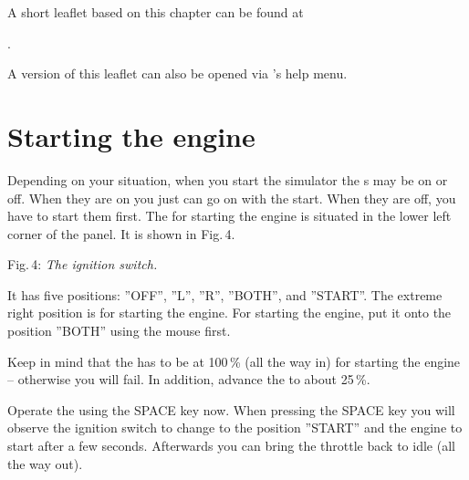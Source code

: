 A short leaflet based on this chapter can be found at
 \medskip

.
 \medskip

\noindent
A version of this leaflet can also be opened via \FlightGear{}'s help menu.

\section{Starting the engine}

Depending on your situation, when you start the simulator the s may be on or off. When they are on you just can go on with the start. When they are off, you have to start them first. The  for starting the engine is situated in the lower left corner of the panel. It is shown in Fig.\,4.
\medskip

 \centerline{}

\smallskip
 \noindent
Fig.\,4: \textit{The ignition switch.}
\medskip

It has five positions: ''OFF'', ''L'', ''R'', ''BOTH'', and ''START''.  The extreme right position is for starting the engine. For starting the engine, put it onto the position ''BOTH'' using the mouse first. 

Keep in mind that the  has to be at 100\,\% (all the way in) for starting the engine -- otherwise you will fail. In addition, advance the  to about 25\,\%.

Operate the  using the SPACE key now. When pressing the SPACE key you will observe the ignition switch to change to the position ''START'' and the engine to start after a few seconds.  Afterwards you can bring the throttle back to idle (all the way out).

